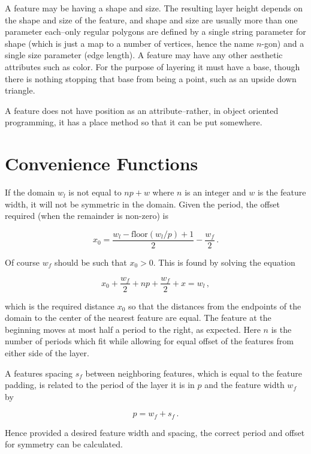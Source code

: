 \documentclass{article}
\begin{document}
A feature may be having a shape and size. The resulting layer height depends on the shape and size of the feature, and shape and size are usually more than one parameter each--only regular polygons are defined by a single string parameter for shape (which is just a map to a number of vertices, hence the name $n$-gon) and a single size parameter (edge length). A feature may have any other aesthetic attributes such as color. For the purpose of layering it must have a base, though there is nothing stopping that base from being a point, such as an upside down triangle.

A feature does not have position as an attribute--rather, in object oriented programming, it has a place method so that it can be put somewhere.

\section{Convenience Functions}

If the domain $w_l$ is not equal to $np + w$ where $n$ is an integer and $w$ is the feature width, it will not be symmetric in the domain. Given the period, the offset required (when the remainder is non-zero) is 

$$x_0 = \frac{w_l - \text{floor}(w_l / p) + 1}{2} - \frac{w_f}{2}\,. $$

Of course $w_f$ should be such that $x_0 > 0$. This is found by solving the equation

$$x_0 + \frac{w_f}{2} + np + \frac{w_f}{2} + x = w_l\,, $$

which is the required distance $x_0$ so that the distances from the endpoints of the domain to the center of the nearest feature are equal. The feature at the beginning moves at most half a period to the right, as expected. Here $n$ is the number of periods which fit while allowing for equal offset of the features from either side of the layer.


A features spacing $s_f$ between neighboring features, which is equal to the feature padding, is related to the period of the layer it is in $p$ and the feature width $w_f$ by

$$p = w_f + s_f \,.$$

Hence provided a desired feature width and spacing, the correct period and offset for symmetry can be calculated.
\end{document}

